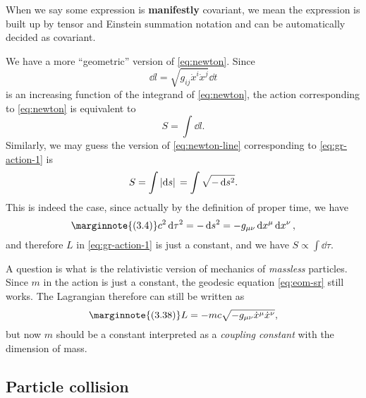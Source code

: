 \documentclass[hyperref, a4paper]{article}
\newcommand*{\concept}[1]{{\textbf{#1}}}
\begin{document}
\begin{note*}{}
    When we say some expression is \concept{manifestly} covariant, we mean the expression is built up by 
    tensor and Einstein summation notation and can be automatically decided as covariant.
\end{note*}

We have a more ``geometric'' version of \eqref{eq:newton}. Since 
\[
    \dd{l} = \sqrt{g_{ij} \dot{x}^i \dot{x}^j} \dd{t}
\]
is an increasing function of the integrand of \eqref{eq:newton}, the action corresponding to \eqref{eq:newton} is equivalent to 
\begin{equation}
    S = \int \dd{l}.
    \label{eq:newton-line}
\end{equation}
Similarly, we may guess the version of \eqref{eq:newton-line} corresponding to \eqref{eq:gr-action-1} 
is 
\begin{equation}
    S = \int \abs*{\dd{s}} = \int \sqrt{- \dd{s^2}}.
\end{equation}
This is indeed the case, since actually by the definition of proper time, we have 
\begin{equation} \marginnote{(3.4)}
    c^2 \dd{\tau^2} = - \dd{s^2} = - g_{\mu \nu} \dd{x^\mu} \dd{x^\nu},
\end{equation}
and therefore $L$ in \eqref{eq:gr-action-1} is just a constant, and we have $S \propto \int \dd{\tau}$.

A question is what is the relativistic version of mechanics of \emph{massless} particles. 
Since $m$ in the action is just a constant, the geodesic equation \eqref{eq:eom-sr} still works. 
The Lagrangian therefore can still be written as 
\begin{equation} \marginnote{(3.38)}
    L = - mc \sqrt{- g_{\mu \nu} \dot{x}^\mu \dot{x}^\nu},
\end{equation}
but now $m$ should be a constant interpreted as a \emph{coupling constant} with the dimension of mass.

\subsection{Particle collision}
\end{document}
